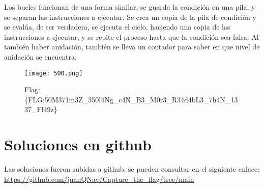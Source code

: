 \documentclass{article}
\begin{document}
Los bucles funcionan de una forma similar, se guarda la condición en una pila, y se separan las instrucciones a ejecutar. Se crea un copia de la pila de condición y se evalúa, de ser verdadera, se ejecuta el ciclo, haciendo una copia de las instrucciones a ejecutar, y se repite el proceso hasta que la condición sea falsa. Al también haber anidación, también se lleva un contador para saber en que nivel de anidación se encuentra.

\begin{figure}[H]
  \centering
  \texttt{[image: 500.png]}
  \caption{Flag: \{FLG:50M371m3Z\_350l4Ng\_c4N\_B3\_M0r3\_R34d4bL3\_7h4N\_1337\_Fl49z\}}
\end{figure}

\section*{Soluciones en github}
Las soluciones fueron subidas a github, se pueden consultar en el siguiente enlace: \url{https://github.com/juanQNav/Capture_the_flag/tree/main}
\end{document}
